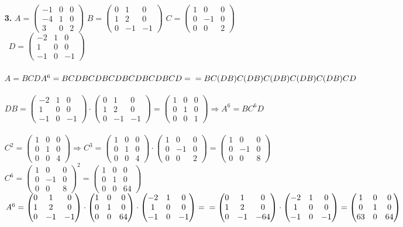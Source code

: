 \documentclass[a4paper]{article}
\newcommand{\mat}[1]{\begin{pmatrix} #1 \end{pmatrix}}
\newcommand{\dspace}{\space\space}
\renewcommand{\r}{\Rightarrow}
\begin{document}
\begin{enumerate}
    \item[\textbf{3.}] $A = \mat{-1 & 0 & 0 \\ -4 & 1 & 0 \\ 3 & 0 & 2}$ \dspace $B = \mat{0 & 1 & 0 \\ 1 & 2 & 0 \\ 0 & -1 & -1}$ \dspace $C = \mat{1 & 0 & 0 \\ 0 & -1 & 0 \\ 0 & 0 & 2}$ \\\ $D = \mat{-2 & 1 & 0 \\ 1 & 0 & 0 \\ -1 & 0 & -1}$ \\
    \\$A = BCD$\dspace $A^6 = BCDBCDBCDBCDBCDBCD =\\= BC(DB)C(DB)C(DB)C(DB)C(DB)CD$\\\\
    $DB = \mat{-2 & 1 & 0 \\ 1 & 0 & 0 \\ -1 & 0 & -1} \cdot \mat{0 & 1 & 0 \\ 1 & 2 & 0 \\ 0 & -1 & -1} = \mat{1 & 0 & 0 \\ 0 & 1 & 0 \\ 0 & 0 & 1} \r A^6= BC^6D$\\\\
    $C^2 = \mat{1 & 0 & 0 \\ 0 & 1 & 0 \\ 0 & 0 & 4} \r C^3 = \mat{1 & 0 & 0 \\ 0 & 1 & 0 \\ 0 & 0 & 4} \cdot \mat{1 & 0 & 0 \\ 0 & -1 & 0 \\ 0 & 0 & 2} = \mat{1 & 0 & 0 \\ 0 & -1 & 0 \\ 0 & 0 & 8}$\\
    $C^6= \mat{1 & 0 & 0 \\ 0 & -1 & 0 \\ 0 & 0 & 8}^2 = \mat{1 & 0 & 0 \\ 0 & 1 & 0 \\ 0 & 0 & 64}$\\
    $A^6 = \mat{0 & 1 & 0 \\ 1 & 2 & 0 \\ 0 & -1 & -1}\cdot \mat{1 & 0 & 0 \\ 0 & 1 & 0 \\ 0 & 0 & 64} \cdot \mat{-2 & 1 & 0 \\ 1 & 0 & 0 \\ -1 & 0 & -1} =\\= \mat{0 & 1 & 0 \\ 1 & 2 & 0 \\ 0 & -1 & -64} \cdot \mat{-2 & 1 & 0 \\ 1 & 0 & 0 \\ -1 & 0 & -1} = \mat{1 & 0 & 0 \\ 0 & 1 & 0 \\ 63 & 0 & 64}$\\

\end{enumerate}
\end{document}
